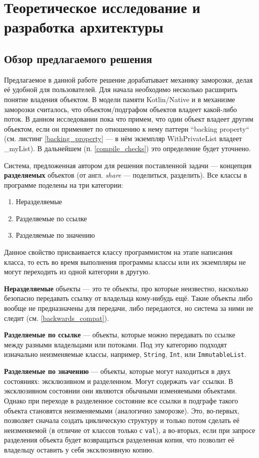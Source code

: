 \documentclass[specification,annotation,times]{itmo-student-thesis}
\begin{document}
\chapter{Теоретическое исследование и разработка архитектуры}

\section{Обзор предлагаемого решения}

Предлагаемое в данной работе решение дорабатывает механику заморозки, делая её удобной для пользователей.
Для начала необходимо несколько расширить понятие владения объектом.
В модели памяти Kotlin/Native и в механизме заморозки считалось, что объектом/подграфом объектов владеет какой-либо поток.
В данном исследовании пока что примем, что один объект владеет другим объектом, если он применяет по отношению к нему паттерн ``backing property`` (см. листинг \ref{backing_property} --- в нём экземпляр WithPrivateList владеет \_myList). В дальнейшем (п. \ref{compile_checks}) это определение будет уточнено.

Система, предложенная автором для решения поставленной задачи --- концепция \textbf{разделяемых} объектов (от англ. \textit{share} --- поделиться, разделить).
Все классы в программе поделены на три категории:
\begin{enumerate}
	\item Неразделяемые
	\item Разделяемые по ссылке
	\item Разделяемые по значению
\end{enumerate}

Данное свойство присваивается классу программистом на этапе написания класса, то есть во время выполнения программы классы или их экземпляры не могут переходить из одной категории в другую.

\textbf{Неразделяемые} объекты --- это те объекты, про которые неизвестно, насколько безопасно передавать ссылку от владельца кому-нибудь ещё.
Такие объекты либо вообще не предназначены для передачи, либо передаются, но система за ними не следит (см. \ref{backwards_compat}).

\textbf{Разделяемые по ссылке} --- объекты, которые можно передавать по ссылке между разными владельцами или потоками.
Под эту категорию подходят изначально неизменяемые классы, например, \texttt{String}, \texttt{Int}, или \texttt{ImmutableList}.

\textbf{Разделяемые по значению} --- объекты, которые могут находиться в двух состояниях: эксклюзивном и разделенном. Могут содержать \texttt{var} ссылки.
В эксклюзивном состоянии они являются обычными изменяемыми объектами.
Однако при переходе в разделенное состояние все ссылки в подграфе такого объекта становятся неизменяемыми (аналогично заморозке).
Это, во-первых, позволяет сначала создать циклическую структуру и только потом сделать её неизменяемой (в отличие от классов только с \texttt{val}),
а во-вторых, если при запросе разделения объекта будет возвращаться разделенная копия, что позволит её владельцу оставить у себя эксклюзивную копию.
\end{document}
